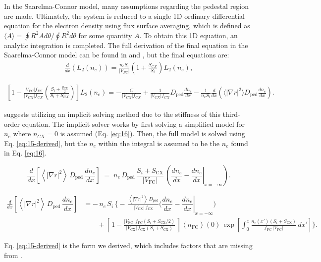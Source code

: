 \documentclass[twocolumn,secnumarabic,amssymb, nobibnotes, aps, prd]{revtex4-2}
\renewcommand{\ne}{n_{e}}  %
\newcommand{\nfc}{n_{\mathrm{FC}}}
\newcommand{\Vfc}{\lvert V_{\mathrm{FC}}\rvert}
\newcommand{\Vcx}{\lvert V_{\mathrm{CX}}\rvert}
\newcommand{\Si}{S_{i}}
\newcommand{\Scx}{S_{\mathrm{CX}}}
\newcommand{\Dped}{D_{\mathrm{ped}}}
\newcommand{\fFC}{f_{\mathrm{FC}}}
\newcommand{\fCX}{f_{\mathrm{CX}}}
\newcommand{\fsa}[1]{\left\langle #1 \right\rangle}
\newcommand{\gradrsq}{\fsa{|\nabla r|^{2}}}
\newcommand{\neginf}{x=-\infty}
\newcommand{\dneneg}{\left.\dfrac{d\ne}{dx}\right|_{\neginf}}
\newcommand{\dnexnow}{\dfrac{d\ne}{dx}}
\newcommand{\nFCzero}{\fsa{\nfc}(0)}
\begin{document}
In the Saarelma-Connor model, many assumptions regarding the pedestal region are made.
Ultimately, the system is reduced to a single 1D ordinary differential equation for the electron density using flux surface averaging, which is defined as $\langle A \rangle = \oint R^2Ad\theta / \oint R^2 d\theta$ for some quantity $A$.
To obtain this 1D equation, an analytic integration is completed.
The full derivation of the final equation in the Saarelma-Connor model can be found in \cite{saarelma2023testing} and \cite{saarelma2024density}, but the final equations are:
\begin{align}
\frac{d}{dx}\left(L_2(n_e)\right)
=
\frac{n_e S_i}{|V_{FC}|}
\left(1+\frac{S_{CX}}{S_i}\right)
L_2(n_e),
\end{align}

\begin{widetext}
\begin{align}
    \left[
1-
\frac{|V_{FC}|f_{FC}}{|V_{CX}|f_{CX}}
\left(
\frac{S_i+\frac{S_{CX}}{2}}{S_i+S_{CX}}
\right)
\right]
L_2(n_e)
=
-\frac{C}{|V_{CX}|f_{CX}}
+
\frac{1}{|V_{CX}|f_{CX}}
D_{\mathrm{ped}}
\frac{dn_e}{dx}
-
\frac{1}{n_e S_i}
\frac{d}{dx}
\left(
\langle |\nabla r|^2 \rangle
D_{\mathrm{ped}}
\frac{dn_e}{dx}
\right).
\end{align}
\end{widetext}
\cite{saarelma2023testing} suggests utilizing an implicit solving method due to the stiffness of this third-order equation. 
The implicit solver works by first solving a simplified model for $n_e$ where $n_{CX}=0$ is assumed (Eq. \ref{eq:16}).
Then, the full model is solved using Eq. \ref{eq:15-derived}, but the $n_e$ within the integral is assumed to be the $n_e$ found in Eq. \ref{eq:16}.
\begin{widetext}

\begin{equation}
    \frac{d}{dx}\!\left[\gradrsq\,\Dped\,\frac{d\ne}{dx}\right]
    \;=\; \ne\,\Dped\,\frac{\Si+\Scx}{\Vfc}\,
          \left(\frac{d\ne}{dx} - \dneneg\right).
  \label{eq:16}
\end{equation}

\begin{equation}
  \begin{aligned}
    \frac{d}{dx}\!\left[\gradrsq\,\Dped\,\dnexnow\right]
      &= -\,\ne\,\Si\,\Biggl\{
            -\,\frac{\gradrsq\,\Dped}{\Vcx\,\fCX}\bigl(\dnexnow-\dneneg\bigr)  \\
      &\qquad + \left[\,1 - \frac{\Vfc\,\fFC(\Si+\Scx/2)}{\Vcx\,\fCX(\Si+\Scx)}\,\right]
                \nFCzero\,\exp\!\left[\int_{0}^{x}\!\frac{\ne(x')(\Si+\Scx)}{\fFC\,\Vfc}\,dx'\right]
         \Biggr\}.
  \end{aligned}
  \label{eq:15-derived}
\end{equation}
\end{widetext}
Eq. \ref{eq:15-derived} is the form we derived, which includes factors that are missing from \cite{saarelma2023testing}.
\end{document}
